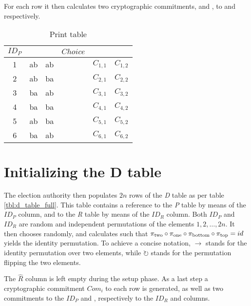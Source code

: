 For each row it then calculates two cryptographic commitments, \ctop{} and
\cbottom{}, to \ptop{} and \pbottom{} respectively.

\begin{table}
	\centering
	\begin{tabular}{|c|c|c|c|c|c|}
		\hline
		$ID_P$ & \ptop & \pbottom & $Choice$ & \ctop & \cbottom \\
		\hline
		1 & ab & ab & & $C_{1, 1}$ & $C_{1, 2}$ \\
		2 & ab & ba & & $C_{2, 1}$ & $C_{2, 2}$ \\
		3 & ba & ab & & $C_{3, 1}$ & $C_{3, 2}$ \\
		4 & ba & ba & & $C_{4, 1}$ & $C_{4, 2}$ \\
		5 & ab & ba & & $C_{5, 1}$ & $C_{5, 2}$ \\
		6 & ba & ab & & $C_{6, 1}$ & $C_{6, 2}$ \\
		\hline
	\end{tabular}
	\label{tbl:p_table_full}
	\caption{Print table}
\end{table}

\section{Initializing the \textbf{D} table}

The election authority then populates $2n$ rows of the \emph{D} table as per
table \ref{tbl:d_table_full}. This table contains a reference to the \emph{P}
table by means of the $ID_P$ column, and to the \emph{R} table by means of the
$ID_R$ column. Both $ID_P$ and $ID_R$ are random and independent permutations
of the elements $1, 2, \ldots, 2n$. It then chooses \pone{} randomly, and
calculates \ptwo{} such that $\pi_{\text{two}} \circ \pi_{\text{one}} \circ \pi_{\text{bottom}} \circ \pi_{\text{top}} =
id$ yields the identity permutation. To achieve a concise notation,
$\rightarrow$ stands for the identity permutation over two elements, while
$\circlearrowright$ stands for the permutation flipping the two elements.

The $\hat{R}$ column is left empty during the setup phase. As a last step a
cryptographic commitment $Com_i$ to each row is generated, as well as two
commitments to the $ID_P$ and \pone{}, respectively to the $ID_R$ and \ptwo{}
columns.

